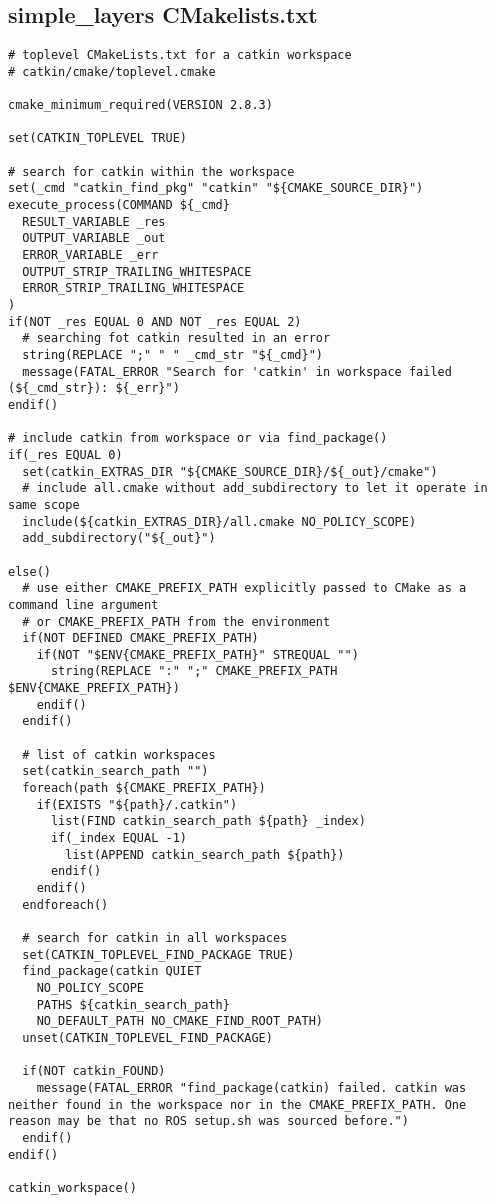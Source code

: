 \subsection{simple\_layers CMakelists.txt}
\begin{lstlisting}
# toplevel CMakeLists.txt for a catkin workspace
# catkin/cmake/toplevel.cmake

cmake_minimum_required(VERSION 2.8.3)

set(CATKIN_TOPLEVEL TRUE)

# search for catkin within the workspace
set(_cmd "catkin_find_pkg" "catkin" "${CMAKE_SOURCE_DIR}")
execute_process(COMMAND ${_cmd}
  RESULT_VARIABLE _res
  OUTPUT_VARIABLE _out
  ERROR_VARIABLE _err
  OUTPUT_STRIP_TRAILING_WHITESPACE
  ERROR_STRIP_TRAILING_WHITESPACE
)
if(NOT _res EQUAL 0 AND NOT _res EQUAL 2)
  # searching fot catkin resulted in an error
  string(REPLACE ";" " " _cmd_str "${_cmd}")
  message(FATAL_ERROR "Search for 'catkin' in workspace failed (${_cmd_str}): ${_err}")
endif()

# include catkin from workspace or via find_package()
if(_res EQUAL 0)
  set(catkin_EXTRAS_DIR "${CMAKE_SOURCE_DIR}/${_out}/cmake")
  # include all.cmake without add_subdirectory to let it operate in same scope
  include(${catkin_EXTRAS_DIR}/all.cmake NO_POLICY_SCOPE)
  add_subdirectory("${_out}")

else()
  # use either CMAKE_PREFIX_PATH explicitly passed to CMake as a command line argument
  # or CMAKE_PREFIX_PATH from the environment
  if(NOT DEFINED CMAKE_PREFIX_PATH)
    if(NOT "$ENV{CMAKE_PREFIX_PATH}" STREQUAL "")
      string(REPLACE ":" ";" CMAKE_PREFIX_PATH $ENV{CMAKE_PREFIX_PATH})
    endif()
  endif()

  # list of catkin workspaces
  set(catkin_search_path "")
  foreach(path ${CMAKE_PREFIX_PATH})
    if(EXISTS "${path}/.catkin")
      list(FIND catkin_search_path ${path} _index)
      if(_index EQUAL -1)
        list(APPEND catkin_search_path ${path})
      endif()
    endif()
  endforeach()

  # search for catkin in all workspaces
  set(CATKIN_TOPLEVEL_FIND_PACKAGE TRUE)
  find_package(catkin QUIET
    NO_POLICY_SCOPE
    PATHS ${catkin_search_path}
    NO_DEFAULT_PATH NO_CMAKE_FIND_ROOT_PATH)
  unset(CATKIN_TOPLEVEL_FIND_PACKAGE)

  if(NOT catkin_FOUND)
    message(FATAL_ERROR "find_package(catkin) failed. catkin was neither found in the workspace nor in the CMAKE_PREFIX_PATH. One reason may be that no ROS setup.sh was sourced before.")
  endif()
endif()

catkin_workspace()

\end{lstlisting}

